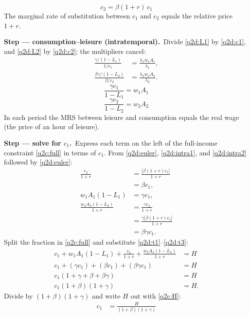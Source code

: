 \documentclass[11pt,a4paper]{article}
\newcommand{\passo}[2]{\par\smallskip\noindent\textbf{Step --- #1.}~#2}
\begin{document}
\begin{sol}
\begin{equation}
\boxed{c_2=\beta(1+r)\,c_1} \label{q2d:euler}
\end{equation}
The marginal rate of substitution between $c_1$ and $c_2$ equals the relative price $1+r$.
\passo{consumption--leisure (intratemporal)}{Divide \eqref{q2d:L1} by \eqref{q2d:c1}, and
\eqref{q2d:L2} by \eqref{q2d:c2}; the multipliers cancel:}
\begin{align*}
\frac{\gamma/(1-L_1)}{1/c_1} &= \frac{\lambda_1w_1A_1}{\lambda_1},\\
\frac{\beta\gamma/(1-L_2)}{\beta/c_2} &= \frac{\lambda_2w_2A_2}{\lambda_2}.
\end{align*}
\begin{equation}
\boxed{\frac{\gamma c_1}{1-L_1}=w_1A_1} \label{q2d:intra1}
\end{equation}
\begin{equation}
\boxed{\frac{\gamma c_2}{1-L_2}=w_2A_2} \label{q2d:intra2}
\end{equation}
In each period the MRS between leisure and consumption equals the real wage (the price of an hour
of leisure).
\passo{solve for $c_1$}{Express each term on the left of the full-income constraint
\eqref{q2c:full} in terms of $c_1$. From \eqref{q2d:euler}, \eqref{q2d:intra1}, and
\eqref{q2d:intra2} followed by \eqref{q2d:euler}:}
\begin{align}
\frac{c_2}{1+r} &= \frac{\big[\beta(1+r)c_1\big]}{1+r}\nonumber\\
&= \beta c_1, \label{q2d:t1}\\
w_1A_1(1-L_1) &= \gamma c_1, \label{q2d:t2}\\
\frac{w_2A_2(1-L_2)}{1+r} &= \frac{\gamma c_2}{1+r}\nonumber\\
&= \frac{\gamma\big[\beta(1+r)c_1\big]}{1+r}\nonumber\\
&= \beta\gamma c_1. \label{q2d:t3}
\end{align}
Split the fraction in \eqref{q2c:full} and substitute \eqref{q2d:t1}--\eqref{q2d:t3}:
\begin{align*}
c_1+w_1A_1(1-L_1)+\frac{c_2}{1+r}+\frac{w_2A_2(1-L_2)}{1+r} &= H\\
c_1+(\gamma c_1)+(\beta c_1)+(\beta\gamma c_1) &= H\\
c_1(1+\gamma+\beta+\beta\gamma) &= H\\
c_1(1+\beta)(1+\gamma) &= H.
\end{align*}
Divide by $(1+\beta)(1+\gamma)$ and write $H$ out with \eqref{q2c:H}:
\begin{align}
c_1 &= \frac{H}{(1+\beta)(1+\gamma)}\nonumber\\

\end{align}
\end{sol}
\end{document}

